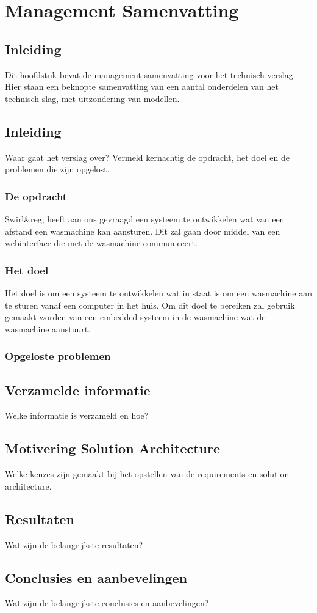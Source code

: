 \chapter{Management Samenvatting}
\section{Inleiding}
Dit hoofdstuk bevat de management samenvatting voor het technisch verslag.
Hier staan een beknopte samenvatting van een aantal onderdelen van het technisch slag, met uitzondering van modellen.
\newpage

\section{Inleiding}
Waar gaat het verslag over? Vermeld kernachtig de opdracht, het doel en de problemen die zijn opgelost.
\subsection{De opdracht}
Swirl&reg; heeft aan ons gevraagd een systeem te ontwikkelen wat van een afstand een wasmachine kan aansturen.
Dit zal gaan door middel van een webinterface die met de wasmachine communiceert.
\subsection{Het doel}
Het doel is om een systeem te ontwikkelen wat in staat is om een wasmachine aan te sturen vanaf een computer in het huis.
Om dit doel te bereiken zal gebruik gemaakt worden van een embedded systeem in de wasmachine wat de wasmachine aanstuurt.
\subsection{Opgeloste problemen}

\section{Verzamelde informatie}
Welke informatie is verzameld en hoe?

\section{Motivering Solution Architecture}
Welke keuzes zijn gemaakt bij het opstellen van de requirements en solution architecture.

\section{Resultaten}
Wat zijn de belangrijkste resultaten?

\section{Conclusies en aanbevelingen}
Wat zijn de belangrijkste conclusies en aanbevelingen?